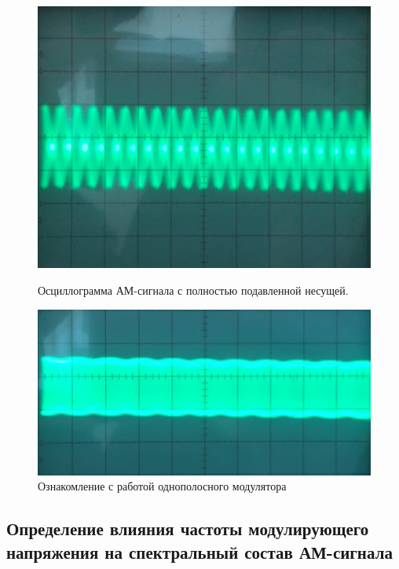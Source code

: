 \begin{figure}[H]
\begin{minipage}[h]{0.49\linewidth}
	\centering
	\includegraphics[width=\linewidth]{img/img4}
	\caption{Осциллограмма АМ-сигнала с полностью подавленной несущей.}
	\label{fig:rec3}
\end{minipage}
\hfill
\begin{minipage}[h]{0.49\linewidth}
	\centering
	\includegraphics[width=\linewidth]{img/img3}
	\caption{Ознакомление с работой однополосного модулятора }
	\label{fig:rec4}
\end{minipage}
\end{figure}




\subsection{Определение влияния частоты модулирующего напряжения на спектральный состав АМ-сигнала}

